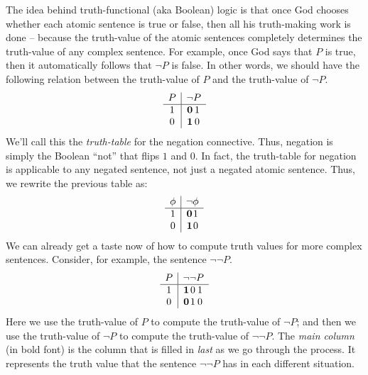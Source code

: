 The idea behind truth-functional (aka Boolean) logic is that once God
chooses whether each atomic sentence is true or false, then all his
truth-making work is done -- because the truth-value of the atomic
sentences completely determines the truth-value of any complex
sentence.  For example, once God says that $P$ is true, then it
automatically follows that $\neg P$ is false.  In other words, we
should have the following relation between the truth-value of $P$ and
the truth-value of $\neg P$.
\[ \begin{array}{c | c@{}c}
     P & \neg & P \\ \hline
         1 & \mathbf{0} & 1 \\
     0 & \mathbf{1} & 0 \end{array} \]
We'll call this the \emph{truth-table} for the negation connective.
Thus, negation is simply the
Boolean ``not'' that flips $1$ and $0$.  In fact, the truth-table for
negation is applicable to any negated sentence, not just a negated
atomic sentence.  Thus, we rewrite the previous table as:
\[ \begin{array}{c | c@{}c}
     \phi & \neg & \phi \\ \hline
         1 & \mathbf{0} & 1 \\
     0 & \mathbf{1} & 0 \end{array} \]
We can already get a taste now of how to compute truth values for more
complex sentences.  Consider, for example, the sentence $\neg\neg P$.
\[ \begin{array}{c | c@{}c@{}c } P & \neg &\neg & P \\ \hline
     1 & \mathbf{1}  & 0 & 1 \\
     0 & \mathbf{0} & 1 & 0 \end{array} \] Here we use the truth-value
 of $P$ to compute the truth-value of $\neg P$; and then we use the truth-value of $\neg P$ to compute the truth-value of $\neg \neg P$.  The \emph{\gls{main column}} (in bold font) is the column that is filled in {\it last} as we go through the process.  It represents the truth value that the sentence $\neg\neg P$ has in each different situation.

